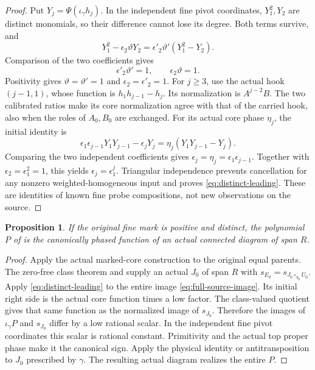 \documentclass[11pt,a4paper]{amsart}
\numberwithin{equation}{section}
\theoremstyle{plain}
\newtheorem{proposition}[theorem]{Proposition}
\theoremstyle{definition}
\begin{document}
\begin{proof}
Put \(Y_j=\Psi(\iota_\gamma h_j)\).  In the independent fine pivot
coordinates, \(Y_1^2,Y_2\) are distinct monomials, so their difference
cannot lose its degree.  Both terms survive, and
\[
 Y_1^2-\epsilon_2\vartheta Y_2
   =\epsilon'_2\vartheta'(Y_1^2-Y_2).
\]
Comparison of the two coefficients gives
\[
 \epsilon'_2\vartheta'=1,\qquad \epsilon_2\vartheta=1.
\]
Positivity gives \(\vartheta=\vartheta'=1\) and
\(\epsilon_2=\epsilon'_2=1\).
For \(j\ge3\), use the actual hook \((j-1,1)\), whose function is
\(h_1h_{j-1}-h_j\).  Its normalization is \(A^{j-2}B\).
The two calibrated ratios make its core normalization agree with
that of the carried hook, also when the roles of \(A_0,B_0\) are
exchanged.  For its actual core phase \(\eta_j\), the initial identity is
\[
 \epsilon_1\epsilon_{j-1}Y_1Y_{j-1}-\epsilon_jY_j
   =\eta_j(Y_1Y_{j-1}-Y_j).
\]
Comparing the two independent coefficients gives
\(\epsilon_j=\eta_j=\epsilon_1\epsilon_{j-1}\).
Together with \(\epsilon_2=\epsilon_1^2=1\), this yields
\(\epsilon_j=\epsilon_1^j\).
Triangular independence prevents cancellation
for any nonzero weighted-homogeneous input and proves
\eqref{eq:distinct-leading}.  These are identities of known fine probe
compositions, not new observations on the source.
\end{proof}

\begin{proposition}\label{prop:distinct-realization}
If the original fine mark is positive and distinct, the polynomial \(P\) of
 is the canonically phased function of an actual
connected diagram of span \(R\).
\end{proposition}
\begin{proof}
Apply the actual marked-core construction to the original equal parents.
The zero-free class theorem and  supply an actual
\(J_0\) of span \(R\) with
\(s_{E_0}=s_{J_0\circ_{\eta_0}U_0}\).  Apply
\eqref{eq:distinct-leading} to the entire image
\eqref{eq:full-source-image}.  Its initial right side is the actual core
function times a low factor.  The class-valued quotient gives that same
function as the normalized image of \(s_{J_0}\).  Therefore the images of
\(\iota_\gamma P\) and \(s_{J_0}\) differ by a low rational scalar.
In the independent fine pivot coordinates this scalar is rational
constant.  Primitivity and the actual top proper phase make it the
canonical sign.  Apply the physical identity or antitransposition to
\(J_0\) prescribed by \(\gamma\).  The resulting actual diagram realizes the
entire \(P\).
\end{proof}
\end{document}

